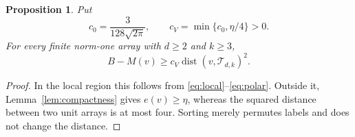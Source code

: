 \documentclass[11pt,reqno]{amsart}
\numberwithin{equation}{section}
\newtheorem{proposition}[theorem]{Proposition}
\theoremstyle{definition}
\theoremstyle{remark}
\newcommand{\cT}{\mathcal T}
\DeclareMathOperator{\dist}{dist}
\begin{document}
\begin{proposition}\label{prop:score}
Put
\begin{equation}\label{eq:cv}
 c_0=\frac3{128\sqrt{2\pi}},\qquad c_V=\min\{c_0,\eta/4\}>0.
\end{equation}
For every finite norm-one array with $d\ge2$ and $k\ge3$,
\begin{equation}\label{eq:score}
                         B-M(v)\ge c_V\dist(v,\cT_{d,k})^2.
\end{equation}
\end{proposition}
\begin{proof}
In the local region this follows from
\eqref{eq:local}--\eqref{eq:polar}. Outside it,
Lemma~\ref{lem:compactness} gives $e(v)\ge\eta$, whereas the
squared distance between two unit arrays is at most four.
Sorting merely permutes labels and does not change the distance.
\end{proof}
\end{document}
